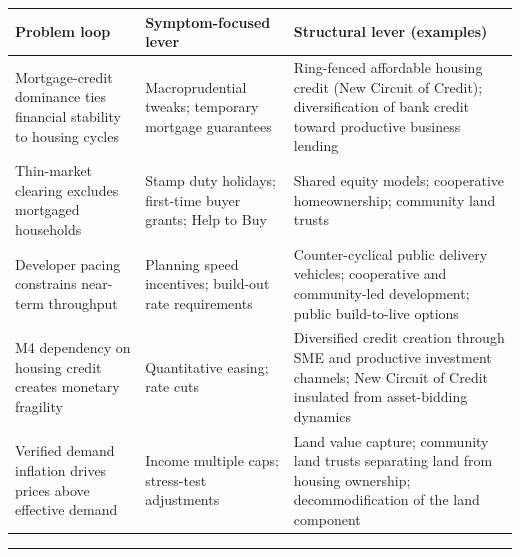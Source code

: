 {\def\LTcaptype{none} %
\begin{longtable}[]{@{}
  >{\raggedright\arraybackslash}p{}
  >{\raggedright\arraybackslash}p{}
  >{\raggedright\arraybackslash}p{}@{}}
\toprule\noalign{}
\begin{minipage}[b]{\linewidth}\raggedright
\textbf{Problem loop}
\end{minipage} & \begin{minipage}[b]{\linewidth}\raggedright
\textbf{Symptom-focused lever}
\end{minipage} & \begin{minipage}[b]{\linewidth}\raggedright
\textbf{Structural lever (examples)}
\end{minipage} \\
\midrule\noalign{}
\endhead
\bottomrule\noalign{}
\endlastfoot
Mortgage-credit dominance ties financial stability to housing cycles &
Macroprudential tweaks; temporary mortgage guarantees & Ring-fenced
affordable housing credit (New Circuit of Credit); diversification of
bank credit toward productive business lending \\
Thin-market clearing excludes mortgaged households & Stamp duty
holidays; first-time buyer grants; Help to Buy & Shared equity models;
cooperative homeownership; community land trusts \\
Developer pacing constrains near-term throughput & Planning speed
incentives; build-out rate requirements & Counter-cyclical public
delivery vehicles; cooperative and community-led development; public
build-to-live options \\
M4 dependency on housing credit creates monetary fragility &
Quantitative easing; rate cuts & Diversified credit creation through SME
and productive investment channels; New Circuit of Credit insulated from
asset-bidding dynamics \\
Verified demand inflation drives prices above effective demand & Income
multiple caps; stress-test adjustments & Land value capture; community
land trusts separating land from housing ownership; decommodification of
the land component \\
\end{longtable}
}

\begin{center}\rule{0.5\linewidth}{0.5pt}\end{center}

